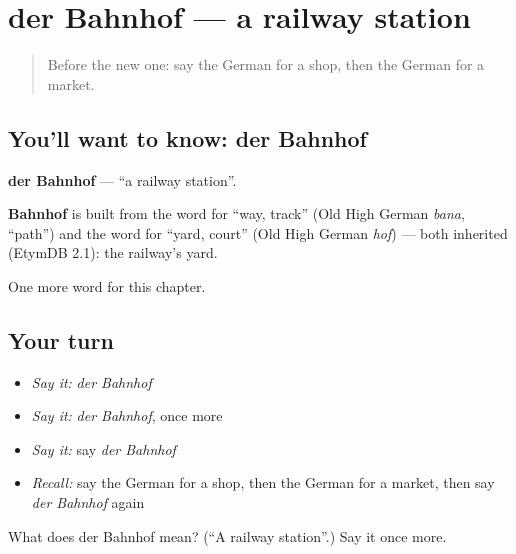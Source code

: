 \section[der Bahnhof]{der Bahnhof — a railway station}

\label{lesson:GE-C96-bahnhof}



\begin{quote}
Before the new one: say the German for a shop, then the German for a market.
\end{quote}

\subsection*{You'll want to know: der Bahnhof}
\textbf{der Bahnhof} — \textquotedblleft{}a railway station\textquotedblright{}.

\begin{cousinweb}
\textbf{Bahnhof} is built from the word for \textquotedblleft{}way, track\textquotedblright{} (Old High German \emph{bana}, \textquotedblleft{}path\textquotedblright{}) and the word for \textquotedblleft{}yard, court\textquotedblright{} (Old High German \emph{hof}) — both inherited (EtymDB 2.1): the railway's yard.
\end{cousinweb}

\begin{grammarlens}[title={What you've built}]
One more word for this chapter.
\end{grammarlens}

\subsection*{Your turn}
\begin{itemize}
\raggedright
  \item \emph{Say it:} \emph{der Bahnhof}
  \item \emph{Say it:} \emph{der Bahnhof}, once more
  \item \emph{Say it:} say \emph{der Bahnhof}
  \item \emph{Recall:} say the German for a shop, then the German for a market, then say \emph{der Bahnhof} again
\end{itemize}

\begin{tcolorbox}[breakable,colback=teal!4,colframe=teal!35!black,title={Before you move on}]
What does der Bahnhof mean? (\textquotedblleft{}A railway station\textquotedblright{}.) Say it once more.
\end{tcolorbox}
